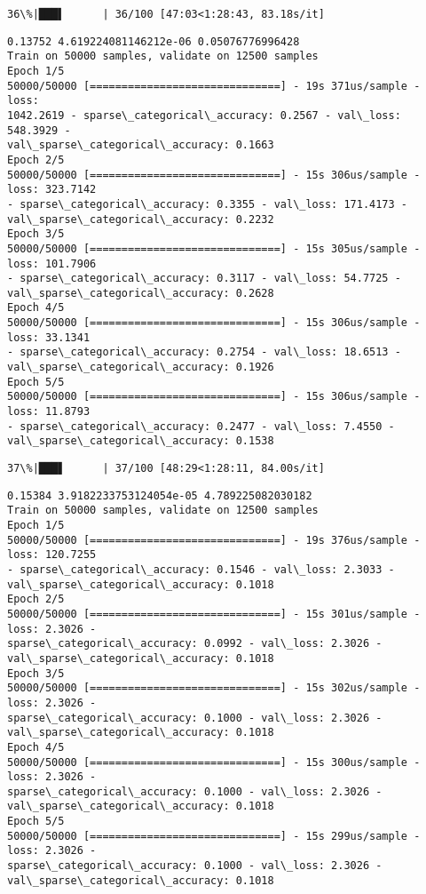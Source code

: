 \documentclass[11pt]{article}
\begin{document}
    \begin{Verbatim}[commandchars=\\\{\}]
 36\%|███▌      | 36/100 [47:03<1:28:43, 83.18s/it]
    \end{Verbatim}

    \begin{Verbatim}[commandchars=\\\{\}]
0.13752 4.619224081146212e-06 0.05076776996428
Train on 50000 samples, validate on 12500 samples
Epoch 1/5
50000/50000 [==============================] - 19s 371us/sample - loss:
1042.2619 - sparse\_categorical\_accuracy: 0.2567 - val\_loss: 548.3929 -
val\_sparse\_categorical\_accuracy: 0.1663
Epoch 2/5
50000/50000 [==============================] - 15s 306us/sample - loss: 323.7142
- sparse\_categorical\_accuracy: 0.3355 - val\_loss: 171.4173 -
val\_sparse\_categorical\_accuracy: 0.2232
Epoch 3/5
50000/50000 [==============================] - 15s 305us/sample - loss: 101.7906
- sparse\_categorical\_accuracy: 0.3117 - val\_loss: 54.7725 -
val\_sparse\_categorical\_accuracy: 0.2628
Epoch 4/5
50000/50000 [==============================] - 15s 306us/sample - loss: 33.1341
- sparse\_categorical\_accuracy: 0.2754 - val\_loss: 18.6513 -
val\_sparse\_categorical\_accuracy: 0.1926
Epoch 5/5
50000/50000 [==============================] - 15s 306us/sample - loss: 11.8793
- sparse\_categorical\_accuracy: 0.2477 - val\_loss: 7.4550 -
val\_sparse\_categorical\_accuracy: 0.1538
    \end{Verbatim}

    \begin{Verbatim}[commandchars=\\\{\}]
 37\%|███▋      | 37/100 [48:29<1:28:11, 84.00s/it]
    \end{Verbatim}

    \begin{Verbatim}[commandchars=\\\{\}]
0.15384 3.9182233753124054e-05 4.789225082030182
Train on 50000 samples, validate on 12500 samples
Epoch 1/5
50000/50000 [==============================] - 19s 376us/sample - loss: 120.7255
- sparse\_categorical\_accuracy: 0.1546 - val\_loss: 2.3033 -
val\_sparse\_categorical\_accuracy: 0.1018
Epoch 2/5
50000/50000 [==============================] - 15s 301us/sample - loss: 2.3026 -
sparse\_categorical\_accuracy: 0.0992 - val\_loss: 2.3026 -
val\_sparse\_categorical\_accuracy: 0.1018
Epoch 3/5
50000/50000 [==============================] - 15s 302us/sample - loss: 2.3026 -
sparse\_categorical\_accuracy: 0.1000 - val\_loss: 2.3026 -
val\_sparse\_categorical\_accuracy: 0.1018
Epoch 4/5
50000/50000 [==============================] - 15s 300us/sample - loss: 2.3026 -
sparse\_categorical\_accuracy: 0.1000 - val\_loss: 2.3026 -
val\_sparse\_categorical\_accuracy: 0.1018
Epoch 5/5
50000/50000 [==============================] - 15s 299us/sample - loss: 2.3026 -
sparse\_categorical\_accuracy: 0.1000 - val\_loss: 2.3026 -
val\_sparse\_categorical\_accuracy: 0.1018
    \end{Verbatim}
\end{document}
